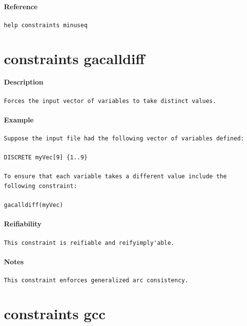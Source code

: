 \documentclass[oneside]{book}
\begin{document}
\paragraph{Reference}
{\footnotesize
\begin{verbatim}
help constraints minuseq
\end{verbatim}
}
\section{constraints gacalldiff}
\paragraph{Description}
{\footnotesize
\begin{verbatim}
Forces the input vector of variables to take distinct values.
\end{verbatim}
}
\paragraph{Example}
{\footnotesize
\begin{verbatim}
Suppose the input file had the following vector of variables defined:

DISCRETE myVec[9] {1..9}

To ensure that each variable takes a different value include the
following constraint:

gacalldiff(myVec)
\end{verbatim}
}
\paragraph{Reifiability}
{\footnotesize
\begin{verbatim}
This constraint is reifiable and reifyimply'able.
\end{verbatim}
}
\paragraph{Notes}
{\footnotesize
\begin{verbatim}
This constraint enforces generalized arc consistency.
\end{verbatim}
}
\section{constraints gcc}
\end{document}

